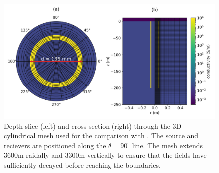 \begin{figure}
    \begin{center}
    \includegraphics[width=0.8\columnwidth]{figures/commer_model.png}
    \end{center}
\caption{
    Depth slice (left) and cross section (right) through the 3D cylindrical
    mesh used for the comparison with \cite{Commer2015}.
    The source and recievers are positioned along the $\theta = 90^\circ$ line.
    The mesh extends 3600m raidally and 3300m vertically to ensure that the fields
    have sufficiently decayed before reaching the boundaries.
}
\label{fig:commer_model}
\end{figure}
